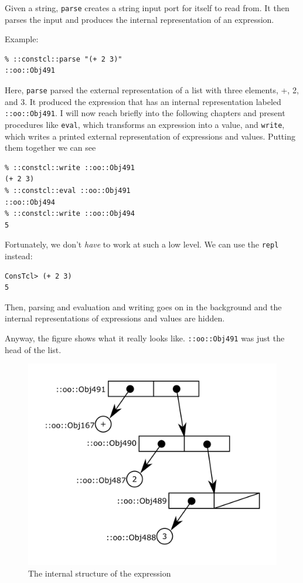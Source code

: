 \documentclass[twoside,9pt]{report}
\begin{document}
Given a string, \texttt{parse} creates a string input port for itself to read from. It then parses the input and produces the internal representation of an expression.


Example:

\begin{verbatim}
% ::constcl::parse "(+ 2 3)"
::oo::Obj491
\end{verbatim}


Here, \texttt{parse} parsed the external representation of a list with three elements, +, 2, and 3. It produced the expression that has an internal representation labeled \texttt{::oo::Obj491}. I will now reach briefly into the following chapters and present procedures like \texttt{eval}, which transforms an expression into a value, and \texttt{write}, which writes a printed external representation of expressions and values. Putting them together we can see

\begin{verbatim}
% ::constcl::write ::oo::Obj491
(+ 2 3)
% ::constcl::eval ::oo::Obj491
::oo::Obj494
% ::constcl::write ::oo::Obj494
5
\end{verbatim}


Fortunately, we don't \emph{have} to work at such a low level. We can use the \texttt{repl} instead:

\begin{verbatim}
ConsTcl> (+ 2 3)
5
\end{verbatim}


Then, parsing and evaluation and writing goes on in the background and the internal representations of expressions and values are hidden.


Anyway, the figure shows what it really looks like. \texttt{::oo::Obj491} was just the head of the list.

\begin{figure}[h!]\includegraphics{images/intreplist.png}\captionsetup{labelformat=empty}\caption{ The internal structure of the expression}\label{fig:-the-internal-structure-of-the-expression}\end{figure}
\end{document}
